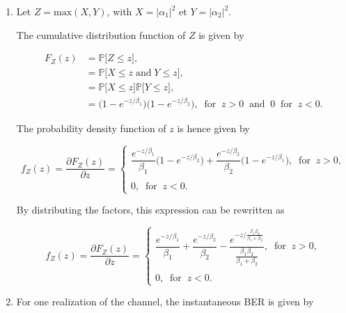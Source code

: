 \documentclass [a4paper, 11pt] {article}
\begin{document}
\begin{solution}
\begin{enumerate}
\item Let $Z = \text{max}(X,Y)$, with $X = |\alpha_1|^2$ et $Y = |\alpha_2|^2$.

The cumulative distribution function of $Z$ is given by

\begin{align}
    F_Z(z) &= \mathbb{P}\big[ Z \leq z\big], \\
    &= \mathbb{P}\big[ X \leq z \; \text{and} \; Y \leq z\big], \\
    &= \mathbb{P}\big[ X \leq z\big]\mathbb{P}\big[ Y \leq z\big], \\
    &= \Big(1-e^{-z/\beta_1} \Big)\Big(1-e^{-z/\beta_2} \Big), \; \; \text{for} \; \; z > 0 \; \; \text{and} \; \; 0 \; \; \text{for} \; \; z < 0.
\end{align}

The probability density function of $z$ is hence given by

\begin{equation}
    f_Z(z) = \dfrac{\partial F_Z(z)}{\partial z}=\left\{
                \begin{array}{ll}
                 \dfrac{e^{-z/\beta_1}}{\beta_1}\Big(1-e^{-z/\beta_2} \Big) + \dfrac{e^{-z/\beta_2}}{\beta_2}\Big(1-e^{-z/\beta_1} \Big), \; \; \text{for} \; \; z > 0, \\
                  \\
                0, \; \; \text{for} \; \; z < 0.
                \end{array}
              \right.
\end{equation}

By distributing the factors, this expression can be rewritten as

\begin{equation}
    f_Z(z) = \dfrac{\partial F_Z(z)}{\partial z}=\left\{
                \begin{array}{ll}
                 \dfrac{e^{-z/\beta_1}}{\beta_1} + \dfrac{e^{-z/\beta_2}}{\beta_2} - \dfrac{e^{-z/\frac{\beta_1 \beta_2}{\beta_1+\beta_2}}}{\frac{\beta_1 \beta_2}{\beta_1+\beta_2}}, \; \; \text{for} \; \; z > 0, \\
                  \\
                0, \; \; \text{for} \; \; z < 0.
                \end{array}
              \right.
\end{equation}

\item For one realization of the channel, the instantaneous BER is given by


\end{enumerate}
\end{solution}
\end{document}
